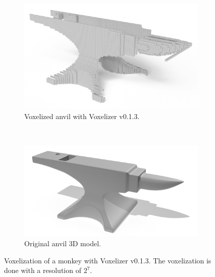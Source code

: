 \begin{figure}[p]
    \centering
    \begin{subfigure}[b]{0.7\textwidth}
        \centering
        \includegraphics[width=\textwidth]{sections/theory/figures/voxelizer-v013-anvil-128.png}
        \caption{Voxelized anvil with Voxelizer v0.1.3.}
        \label{fig:theory-voxelizer-v0.1.3-anvil-result}
    \end{subfigure}
    \\
    \begin{subfigure}[b]{0.7\textwidth}
        \centering
        \includegraphics[width=\textwidth]{sections/theory/figures/anvil.png}
        \caption{Original anvil 3D model.}
        \label{fig:original-anvil}
    \end{subfigure}
    \hfill
    \caption{Voxelization of a monkey with Voxelizer v0.1.3. The voxelization is done with a resolution of $2^7$.}
    \label{fig:theory-voxelizer-v0.1.3-anvil}
\end{figure}